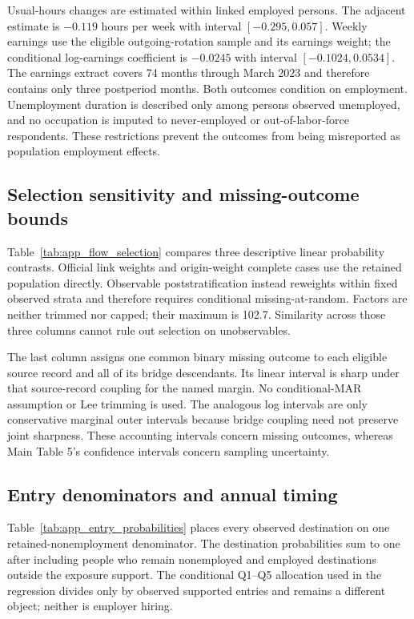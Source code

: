 Usual-hours changes are estimated within linked employed persons.  The adjacent estimate is $-0.119$ hours per week with interval $[-0.295,0.057]$.  Weekly earnings use the eligible outgoing-rotation sample and its earnings weight; the conditional log-earnings coefficient is $-0.0245$ with interval $[-0.1024,0.0534]$.  The earnings extract covers 74 months through March 2023 and therefore contains only three postperiod months.  Both outcomes condition on employment.  Unemployment duration is described only among persons observed unemployed, and no occupation is imputed to never-employed or out-of-labor-force respondents.  These restrictions prevent the outcomes from being misreported as population employment effects.



\subsection{Selection sensitivity and missing-outcome bounds}

Table~\ref{tab:app_flow_selection} compares three descriptive linear
probability contrasts.  Official link weights and origin-weight complete cases
use the retained population directly.  Observable poststratification instead
reweights within fixed observed strata and therefore requires conditional
missing-at-random.  Factors are neither trimmed nor capped; their maximum is
102.7.  Similarity across those three columns cannot rule out selection on
unobservables.



The last column assigns one common binary missing outcome to each eligible
source record and all of its bridge descendants.  Its linear interval is sharp
under that source-record coupling for the named margin.  No conditional-MAR
assumption or Lee trimming is used.  The analogous log intervals are only
conservative marginal outer intervals because bridge coupling need not preserve
joint sharpness.  These accounting intervals concern missing outcomes, whereas
Main Table 5's confidence intervals concern sampling uncertainty.

\subsection{Entry denominators and annual timing}

Table~\ref{tab:app_entry_probabilities} places every observed destination on
one retained-nonemployment denominator.  The destination probabilities sum to
one after including people who remain nonemployed and employed destinations
outside the exposure support.  The conditional Q1--Q5 allocation used in the
regression divides only by observed supported entries and remains a different
object; neither is employer hiring.

